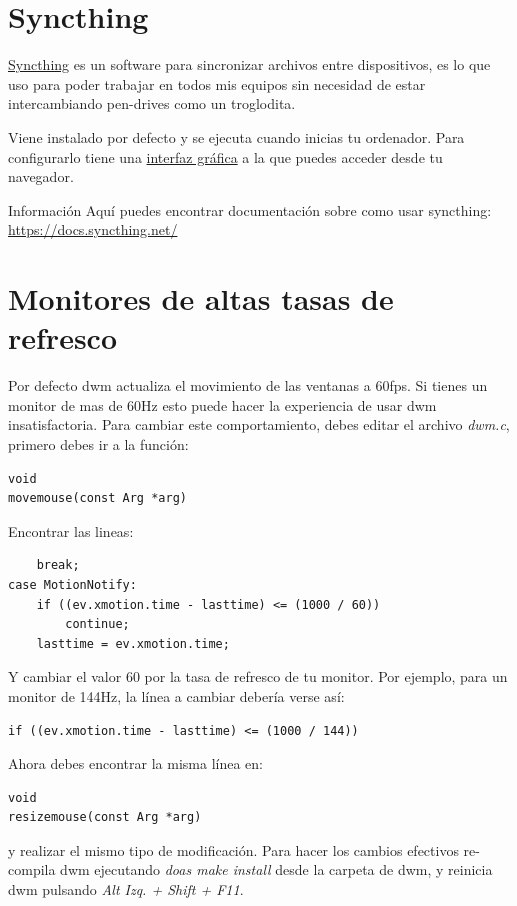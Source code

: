 \documentclass[12pt]{article}
\begin{document}
\section{Syncthing}

\href{https://github.com/syncthing/syncthing}{Syncthing} es un software para sincronizar archivos entre dispositivos, es lo que uso para poder trabajar en todos mis equipos sin necesidad de estar intercambiando pen-drives como un troglodita.

Viene instalado por defecto y se ejecuta cuando inicias tu ordenador. Para configurarlo tiene una \href{http://localhost:8384/}{interfaz gráfica} a la que puedes acceder desde tu navegador.

\begin{mybox}{Información}
Aquí puedes encontrar documentación sobre como usar syncthing: \href{https://docs.syncthing.net/}{https://docs.syncthing.net/}
\end{mybox}


\section{Monitores de altas tasas de refresco}

Por defecto dwm actualiza el movimiento de las ventanas a 60fps. Si tienes un monitor de mas de 60Hz esto puede hacer la experiencia de usar dwm insatisfactoria. Para cambiar este comportamiento, debes editar el archivo \emph{dwm.c}, primero debes ir a la función:

\begin{verbatim}
void
movemouse(const Arg *arg)
\end{verbatim}

Encontrar las lineas:

\begin{verbatim}
    break;
case MotionNotify:
    if ((ev.xmotion.time - lasttime) <= (1000 / 60))
        continue;
    lasttime = ev.xmotion.time;
\end{verbatim}

Y cambiar el valor 60 por la tasa de refresco de tu monitor. Por ejemplo, para un monitor de 144Hz, la línea a cambiar debería verse así:

\begin{verbatim}
if ((ev.xmotion.time - lasttime) <= (1000 / 144))
\end{verbatim}

Ahora debes encontrar la misma línea en:

\begin{verbatim}
void
resizemouse(const Arg *arg)
\end{verbatim}

y realizar el mismo tipo de modificación. Para hacer los cambios efectivos re-compila dwm ejecutando \emph{doas make install} desde la carpeta de dwm, y reinicia dwm pulsando \emph{Alt Izq. + Shift + F11}.
\end{document}
